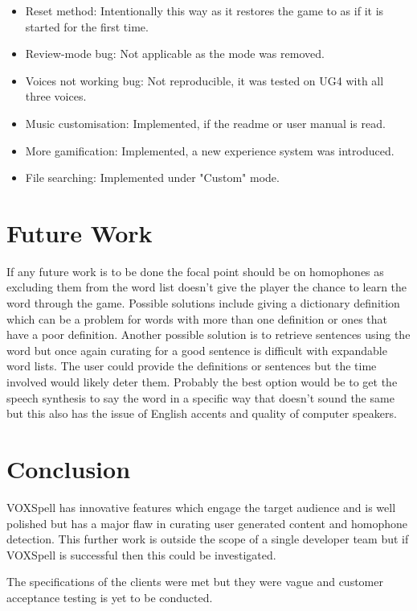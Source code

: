 \documentclass[conference]{IEEEtran}
\begin{document}
\begin{itemize}
		\item Reset method: Intentionally this way as it restores the game to as if it is started for the first time.
		\item Review-mode bug: Not applicable as the mode was removed.
		\item Voices not working bug: Not reproducible, it was tested on UG4 with all three voices.
		\item Music customisation: Implemented, if the readme or user manual is read.
		\item More gamification: Implemented, a new experience system was introduced.
		\item File searching: Implemented under "Custom" mode.
	\end{itemize}
	
	\section{Future Work}
	If any future work is to be done the focal point should be on homophones as excluding them from the word list doesn't give the player the chance to learn the word through the game. Possible solutions include giving a dictionary definition which can be a problem for words with more than one definition or ones that have a poor definition. Another possible solution is to retrieve sentences using the word but once again curating for a good sentence is difficult with expandable word lists. The user could provide the definitions or sentences but the time involved would likely deter them. Probably the best option would be to get the speech synthesis to say the word in a specific way that doesn't sound the same but this also has the issue of English accents and quality of computer speakers.
	
	\section{Conclusion}
	VOXSpell has innovative features which engage the target audience and is well polished but has a major flaw in curating user generated content and homophone detection. This further work is outside the scope of a single developer team but if VOXSpell is successful then this could be investigated.
	
	The specifications of the clients were met but they were vague and customer acceptance testing is yet to be conducted.
	
	
\end{document}
